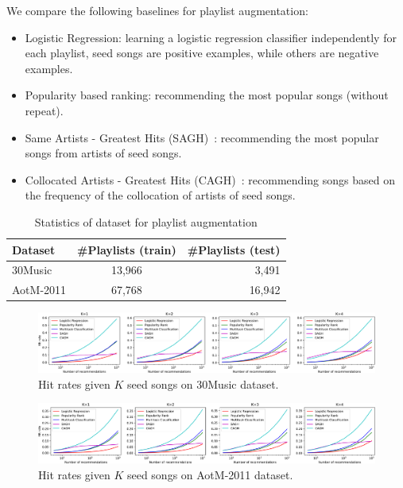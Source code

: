 We compare the following baselines for playlist augmentation:
\begin{itemize}
\item Logistic Regression: learning a logistic regression classifier independently for each playlist,
      seed songs are positive examples, while others are negative examples.
\item Popularity based ranking: recommending the most popular songs (without repeat).
\item Same Artists - Greatest Hits (SAGH)~\cite{mcfee2012million}: 
      recommending the most popular songs from artists of seed songs.
\item Collocated Artists - Greatest Hits (CAGH)~\cite{bonnin2013evaluating}: 
      recommending songs based on the frequency of the collocation of artists of seed songs.
\end{itemize}

\begin{table}[!h]
\centering
\caption{Statistics of dataset for playlist augmentation}
\label{tab:stats_pla}
\small
\begin{tabular}{l|cr}
\toprule
Dataset   & \#Playlists (train) & \#Playlists (test) \\
\midrule
30Music   & 13,966              & 3,491 \\
AotM-2011 & 67,768              & 16,942 \\       
\bottomrule
\end{tabular}
\end{table}



\begin{figure}[!h]
\centering
\includegraphics[width=\linewidth]{fig/30music-2.pdf}
\caption{Hit rates given $K$ seed songs on 30Music dataset.}
\end{figure}

\begin{figure}[!h]
\centering
\includegraphics[width=\linewidth]{fig/aotm2011-2.pdf}
\caption{Hit rates given $K$ seed songs on AotM-2011 dataset.}
\end{figure}



